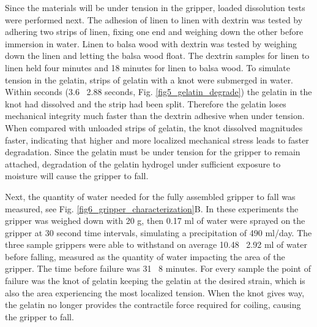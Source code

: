 Since the materials will be under tension in the gripper, loaded dissolution tests were performed next. The adhesion of linen to linen with dextrin was tested by adhering two strips of linen, fixing one end and weighing down the other before immersion in water. Linen to balsa wood with dextrin was tested by weighing down the linen and letting the balsa wood float. The dextrin samples for linen to linen held four minutes and 18 minutes for linen to balsa wood. To simulate tension in the gelatin, strips of gelatin with a knot were submerged in water. Within seconds (3.6 \textpm~2.88 seconds, Fig. \ref{fig5_gelatin_degrade}) the gelatin in the knot had dissolved and the strip had been split. Therefore the gelatin loses mechanical integrity much faster than the dextrin adhesive when under tension. When compared with unloaded strips of gelatin, the knot dissolved magnitudes faster, indicating that higher and more localized mechanical stress leads to faster degradation.
Since the gelatin must be under tension for the gripper to remain attached, degradation of the gelatin hydrogel under sufficient exposure to moisture will cause the gripper to fall.

Next, the quantity of water needed for the fully assembled gripper to  fall was measured, see Fig. \ref{fig6_gripper_characterization}B. In these experiments the gripper was weighed down with 20 g, then 0.17 ml of water were sprayed on the gripper at 30 second time intervals, simulating a precipitation of 490 ml/day. The three sample grippers were able to withstand on average 10.48 \textpm~2.92 ml of water before falling, measured as the quantity of water impacting the area of the gripper. The time before failure was 31 \textpm~8 minutes. For every sample the point of failure was the knot of gelatin keeping the gelatin at the desired strain, which is also the area experiencing the most localized tension. When the knot gives way, the gelatin no longer provides the contractile force required for coiling, causing the gripper to fall.

